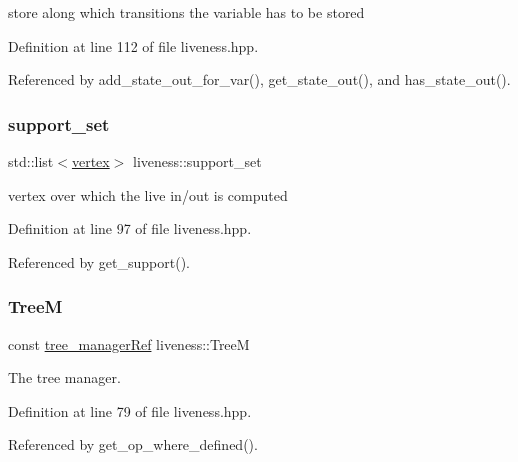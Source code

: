 store along which transitions the variable has to be stored 



Definition at line 112 of file liveness.\+hpp.



Referenced by add\+\_\+state\+\_\+out\+\_\+for\+\_\+var(), get\+\_\+state\+\_\+out(), and has\+\_\+state\+\_\+out().

\mbox{\label{classliveness_a5b11078a7c95877d980deebb160d8f08}} 
\subsubsection{\texorpdfstring{support\+\_\+set}{support\_set}}
{\footnotesize\ttfamily std\+::list$<$\hyperlink{graph_8hpp_abefdcf0544e601805af44eca032cca14}{vertex}$>$ liveness\+::support\+\_\+set\hspace{0.3cm}{\ttfamily [private]}}



vertex over which the live in/out is computed 



Definition at line 97 of file liveness.\+hpp.



Referenced by get\+\_\+support().

\mbox{\label{classliveness_a834e4f8d2f7fc3097ed3abb2e941dc62}} 
\subsubsection{\texorpdfstring{TreeM}{TreeM}}
{\footnotesize\ttfamily const \hyperlink{tree__manager_8hpp_a96ff150c071ce11a9a7a1e40590f205e}{tree\+\_\+manager\+Ref} liveness\+::\+TreeM\hspace{0.3cm}{\ttfamily [private]}}



The tree manager. 



Definition at line 79 of file liveness.\+hpp.



Referenced by get\+\_\+op\+\_\+where\+\_\+defined().

\mbox{\label{classliveness_a834fd1b22c28f08bb6b7e2cacf4d09e2}} 

